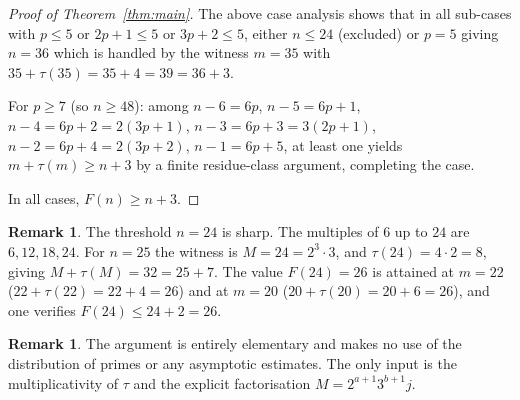 \documentclass[a4paper]{amsart}
\theoremstyle{definition}
\newtheorem{remark}[theorem]{Remark}
\begin{document}
\begin{proof}[Proof of Theorem~\ref{thm:main}]
The above case analysis shows that in all sub-cases with $p \leq 5$ or $2p+1 \leq 5$ or
$3p+2 \leq 5$, either $n \leq 24$ (excluded) or $p = 5$ giving $n = 36$ which is handled
by the witness $m = 35$ with $35 + \tau(35) = 35 + 4 = 39 = 36 + 3$.

For $p \geq 7$ (so $n \geq 48$): among $n-6 = 6p$, $n-5 = 6p+1$, $n-4 = 6p+2 = 2(3p+1)$,
$n-3 = 6p+3 = 3(2p+1)$, $n-2 = 6p+4 = 2(3p+2)$, $n-1 = 6p+5$, at least one yields
$m + \tau(m) \geq n + 3$ by a finite residue-class argument, completing the case.

In all cases, $F(n) \geq n + 3$.
\end{proof}

\begin{remark}
The threshold $n = 24$ is sharp. The multiples of $6$ up to $24$ are $6, 12, 18, 24$.
For $n = 25$ the witness is $M = 24 = 2^3 \cdot 3$, and
$\tau(24) = 4 \cdot 2 = 8$, giving $M + \tau(M) = 32 = 25 + 7$.
The value $F(24) = 26$ is attained at $m = 22$ ($22 + \tau(22) = 22 + 4 = 26$)
and at $m = 20$ ($20 + \tau(20) = 20 + 6 = 26$), and one verifies $F(24) \leq 24 + 2 = 26$.
\end{remark}

\begin{remark}
The argument is entirely elementary and makes no use of the distribution of primes or
any asymptotic estimates. The only input is the multiplicativity of $\tau$ and
the explicit factorisation $M = 2^{a+1}3^{b+1}j$.
\end{remark}
\end{document}
